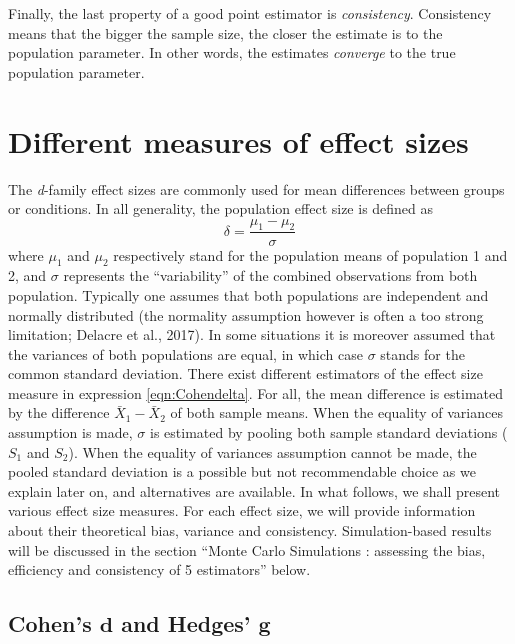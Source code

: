 \documentclass[
  english,
  man,floatsintext]{apa6}
\begin{document}
Finally, the last property of a good point estimator is \emph{consistency}. Consistency means that the bigger the sample size, the closer the estimate is to the population parameter. In other words, the estimates \emph{converge} to the true population parameter.

\hypertarget{different-measures-of-effect-sizes}{%
\section{Different measures of effect sizes}\label{different-measures-of-effect-sizes}}

The \emph{d}-family effect sizes are commonly used for mean differences between groups or conditions. In all generality, the population effect size is defined as
\begin{equation} 
\delta = \frac{\mu_{1}-\mu_{2}}{\sigma} 
\label{eqn:Cohendelta}
\end{equation}
where \(\mu_1\) and \(\mu_2\) respectively stand for the population means of population 1 and 2, and \(\sigma\) represents the ``variability'' of the combined observations from both population. Typically one assumes that both populations are independent and normally distributed (the normality assumption however is often a too strong limitation; Delacre et al., 2017). In some situations it is moreover assumed that the variances of both populations are equal, in which case \(\sigma\) stands for the common standard deviation. There exist different estimators of the effect size measure in expression \ref{eqn:Cohendelta}. For all, the mean difference is estimated by the difference \(\bar{X}_1-\bar{X}_2\) of both sample means. When the equality of variances assumption is made, \(\sigma\) is estimated by pooling both sample standard deviations (\(S_1\) and \(S_2\)). When the equality of variances assumption cannot be made, the pooled standard deviation is a possible but not recommendable choice as we explain later on, and alternatives are available. In what follows, we shall present various effect size measures. For each effect size, we will provide information about their theoretical bias, variance and consistency. Simulation-based results will be discussed in the section ``Monte Carlo Simulations : assessing the bias, efficiency and consistency of 5 estimators'' below.

\hypertarget{cohens-bmd-and-hedges-bmg}{%
\subsection{\texorpdfstring{Cohen's \(\bm{d}\) and Hedges' \(\bm{g}\)}{Cohen's \textbackslash bm\{d\} and Hedges' \textbackslash bm\{g\}}}\label{cohens-bmd-and-hedges-bmg}}
\end{document}
